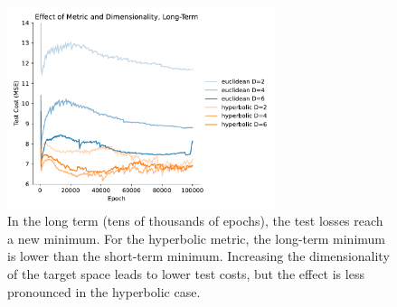 \documentclass{article}
\begin{document}
\begin{figure}[ht]
  \centering
  \includegraphics[width=0.7\textwidth]{figures/metric_and_dimensionality_long_term.pdf}
  \caption{In the long term (tens of thousands of epochs), the test losses reach a new minimum. For the hyperbolic metric, the long-term minimum is lower than the short-term minimum. Increasing the dimensionality of the target space leads to lower test costs, but the effect is less pronounced in the hyperbolic case.}
  \label{fig:metric-and-dimensionality-long-term}
\end{figure}
\end{document}

